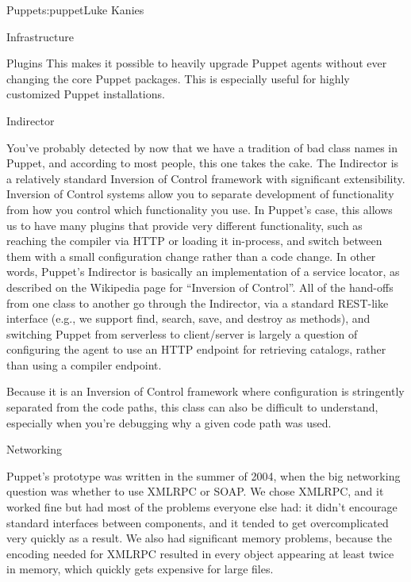 \begin{aosachapter}{Puppet}{s:puppet}{Luke Kanies}
\begin{aosasect1}{Infrastructure}
\begin{aosasect2}{Plugins}
This makes it possible to heavily upgrade Puppet agents without ever
changing the core Puppet packages. This is especially useful for
highly customized Puppet installations.

\end{aosasect2}

\begin{aosasect2}{Indirector}

You've probably detected by now that we have a tradition of bad class
names in Puppet, and according to most people, this one takes the
cake.  The Indirector is a relatively standard Inversion of Control
framework with significant extensibility.  Inversion of Control
systems allow you to separate development of functionality from how
you control which functionality you use.  In Puppet's case, this
allows us to have many plugins that provide very different
functionality, such as reaching the compiler via HTTP or loading it
in-process, and switch between them with a small configuration change
rather than a code change.  In other words, Puppet's Indirector is
basically an implementation of a service locator, as described on the
Wikipedia page for ``Inversion of Control''.  All of the hand-offs from
one class to another go through the Indirector, via a standard
REST-like interface (e.g., we support find, search, save, and destroy
as methods), and switching Puppet from serverless to client/server is
largely a question of configuring the agent to use an HTTP endpoint
for retrieving catalogs, rather than using a compiler endpoint.

Because it is an Inversion of Control framework where configuration
is stringently separated from the code paths, this class can also be
difficult to understand, especially when you're debugging why a given
code path was used.

\end{aosasect2}

\begin{aosasect2}{Networking}

Puppet's prototype was written in the summer of 2004, when the big
networking question was whether to use XMLRPC or SOAP.  We chose
XMLRPC, and it worked fine but had most of the problems everyone else
had: it didn't encourage standard interfaces between components, and
it tended to get overcomplicated very quickly as a result.  We also
had significant memory problems, because the encoding needed for
XMLRPC resulted in every object appearing at least twice in memory,
which quickly gets expensive for large files.


\end{aosasect2}
\end{aosasect1}
\end{aosachapter}
